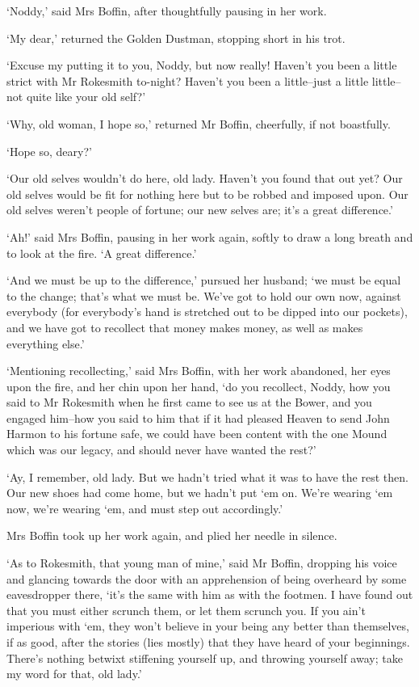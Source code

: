 ‘Noddy,’ said Mrs Boffin, after thoughtfully pausing in her work.

‘My dear,’ returned the Golden Dustman, stopping short in his trot.

‘Excuse my putting it to you, Noddy, but now really! Haven’t you been
a little strict with Mr Rokesmith to-night? Haven’t you been a
little--just a little little--not quite like your old self?’

‘Why, old woman, I hope so,’ returned Mr Boffin, cheerfully, if not
boastfully.

‘Hope so, deary?’

‘Our old selves wouldn’t do here, old lady. Haven’t you found that out
yet? Our old selves would be fit for nothing here but to be robbed and
imposed upon. Our old selves weren’t people of fortune; our new selves
are; it’s a great difference.’

‘Ah!’ said Mrs Boffin, pausing in her work again, softly to draw a long
breath and to look at the fire. ‘A great difference.’

‘And we must be up to the difference,’ pursued her husband; ‘we must be
equal to the change; that’s what we must be. We’ve got to hold our own
now, against everybody (for everybody’s hand is stretched out to be
dipped into our pockets), and we have got to recollect that money makes
money, as well as makes everything else.’

‘Mentioning recollecting,’ said Mrs Boffin, with her work abandoned,
her eyes upon the fire, and her chin upon her hand, ‘do you recollect,
Noddy, how you said to Mr Rokesmith when he first came to see us at the
Bower, and you engaged him--how you said to him that if it had pleased
Heaven to send John Harmon to his fortune safe, we could have been
content with the one Mound which was our legacy, and should never have
wanted the rest?’

‘Ay, I remember, old lady. But we hadn’t tried what it was to have the
rest then. Our new shoes had come home, but we hadn’t put ‘em on. We’re
wearing ‘em now, we’re wearing ‘em, and must step out accordingly.’

Mrs Boffin took up her work again, and plied her needle in silence.

‘As to Rokesmith, that young man of mine,’ said Mr Boffin, dropping
his voice and glancing towards the door with an apprehension of being
overheard by some eavesdropper there, ‘it’s the same with him as with
the footmen. I have found out that you must either scrunch them, or let
them scrunch you. If you ain’t imperious with ‘em, they won’t believe
in your being any better than themselves, if as good, after the stories
(lies mostly) that they have heard of your beginnings. There’s nothing
betwixt stiffening yourself up, and throwing yourself away; take my word
for that, old lady.’

